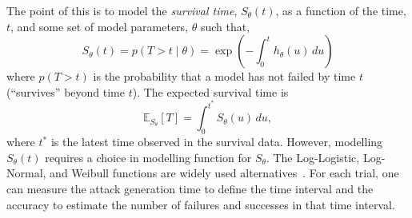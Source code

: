 \documentclass[sn-mathphys-num]{sn-jnl}%
\begin{document}
The point of this is to model the \textit{survival time}, $S_{\theta}(t)$, as a function of the time, $t$,  and some set of model parameters, $\theta$ such that,
\[
    S_{\theta}(t) = p(T>t  \mid \theta) = \exp\left(-\int_0^t h_{\theta}(u) \, du\right)
\]
where $p(T>t)$ is the probability that a model has not failed by time $t$ (``survives'' beyond time $t$). The expected survival time is
\begin{equation}
	\mathbb{E}_{S_\theta}[T] = \int_0^{t^*} S_\theta(u) \,du,
    \label{eq:expectation}
\end{equation}
where $t^*$ is the latest time observed in the survival data. However, modelling $S_{\theta}(t)$ requires a choice in modelling function for $S_{\theta}$. The Log-Logistic, Log-Normal, and Weibull functions are widely used alternatives~\cite{kleinbaum1996survival,meyers_aft}. For each trial, one can measure the attack generation time to define the time interval and the accuracy to estimate the number of failures and successes in that time interval.
\end{document}
